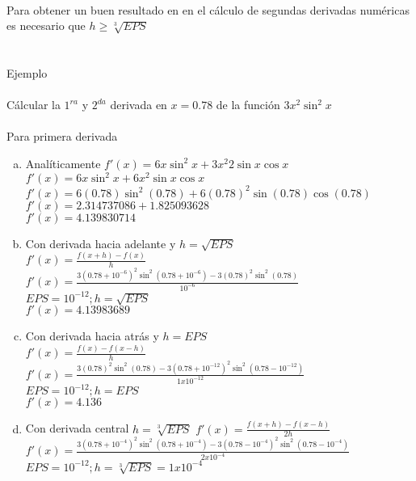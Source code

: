 \\
Para obtener un buen resultado en en el c\'alculo de segundas derivadas num\'ericas es necesario que $h\geq\sqrt[3]{EPS}$ \\ \\ \\
Ejemplo\\ \\
C\'alcular la $1^{ra}$ y $2^{da}$ derivada en $x=0.78$ de la funci\'on $3x^2\sin^2x$\\ \\
Para primera derivada
\begin{enumerate}[a)]
\item Anal\'iticamente
$f'(x)=6x\sin^2 x+3x^2 2\sin x \cos x$\\
$f'(x)=6x\sin^2 x+6x^2\sin x \cos x$\\
$f'(x)=6(0.78)\sin^2 (0.78)+6(0.78)^2\sin (0.78) \cos (0.78)$\\
$f'(x)=2.314737086+1.825093628$\\
$f'(x)=4.139830714$\\
\item Con derivada hacia adelante y $h=\sqrt{EPS}$\\
$f'(x)=\frac{f(x+h)-f(x)}{h}$\\
$f'(x)=\frac{3(0.78+10^{-6})^2\sin^2(0.78+10^{-6})-3(0.78)^2\sin^2(0.78)}{10^{-6}}$\\
$EPS=10^{-12};$\quad $h=\sqrt{EPS}$\\
$f'(x)=4.13983689$\\ 
\item Con derivada hacia atr\'as y $h=EPS$\\
$f'(x)=\frac{f(x)-f(x-h)}{h}$\\
$f'(x)=\frac{3(0.78)^2\sin^2(0.78)-3(0.78+10^{-12})^2\sin^2(0.78-10^{-12})}{1x10^{-12}}$\\
$EPS=10^{-12};$\quad $h=EPS$\\
$f'(x)=4.136$\\ 
\item Con derivada central $h=\sqrt[3]{EPS}$
$f'(x)=\frac{f(x+h)-f(x-h)}{2h}$\\
$f'(x)=\frac{3(0.78+10^{-4})^2\sin^2(0.78+10^{-4})-3(0.78-10^{-4})^2\sin^2(0.78-10^{-4})}{2x10^{-4}}$\\
$EPS=10^{-12};$\quad $h=\sqrt[3]{EPS}=1x10^{-4}$\\
\end{enumerate}



